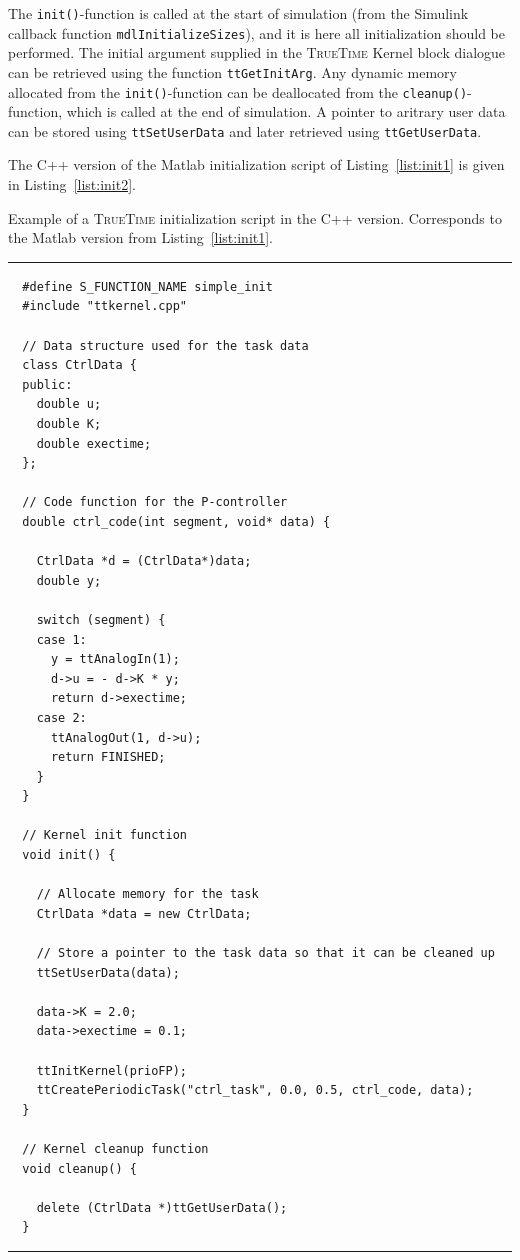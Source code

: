 \documentclass[final,twoside]{rapport}
\begin{document}
The \texttt{init()}-function is called at the start of simulation
(from the Simulink callback function \texttt{mdlInitializeSizes}), and
it is here all initialization should be performed. The initial
argument supplied in the \textsc{TrueTime} Kernel block dialogue can
be retrieved using the function \texttt{ttGetInitArg}. Any dynamic
memory allocated from the \texttt{init()}-function can be deallocated
from the \texttt{cleanup()}-function, which is called at the end of
simulation. A pointer to aritrary user data can be stored using
\texttt{ttSetUserData} and later retrieved using
\texttt{ttGetUserData}.

The C++ version of the Matlab initialization
script of Listing~\ref{list:init1} is given in
Listing~\ref{list:init2}.

\begin{listing}[p]\small
\caption{Example of a \textsc{TrueTime} initialization script in the
  C++ version. Corresponds to the Matlab version from Listing~\ref{list:init1}.}
\label{list:init2}
\vspace{3mm}
\hrule
\begin{verbatim}
  #define S_FUNCTION_NAME simple_init
  #include "ttkernel.cpp"

  // Data structure used for the task data
  class CtrlData {
  public:
    double u;  
    double K;
    double exectime;
  };

  // Code function for the P-controller
  double ctrl_code(int segment, void* data) {

    CtrlData *d = (CtrlData*)data;
    double y;
  
    switch (segment) {
    case 1:
      y = ttAnalogIn(1);
      d->u = - d->K * y;
      return d->exectime;
    case 2:
      ttAnalogOut(1, d->u);
      return FINISHED;
    }
  }

  // Kernel init function    
  void init() {

    // Allocate memory for the task
    CtrlData *data = new CtrlData;
  
    // Store a pointer to the task data so that it can be cleaned up
    ttSetUserData(data);

    data->K = 2.0;
    data->exectime = 0.1;

    ttInitKernel(prioFP);
    ttCreatePeriodicTask("ctrl_task", 0.0, 0.5, ctrl_code, data);
  }

  // Kernel cleanup function
  void cleanup() {

    delete (CtrlData *)ttGetUserData();
  }
\end{verbatim}
\hrule
\end{listing}
\end{document}
